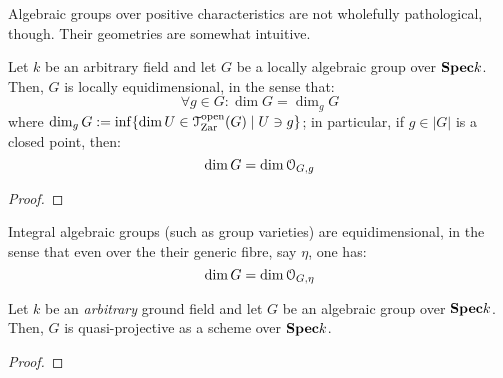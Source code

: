                 Algebraic groups over positive characteristics are not wholefully pathological, though. Their geometries are somewhat intuitive.
                \begin{proposition} \label{prop: algebraic_groups_are_locally_equidimensional} 
                    Let $k$ be an arbitrary field and let $G$ be a locally algebraic group over $\mathbf{Spec} k$. Then, $G$ is locally equidimensional, in the sense that:
                        $$\forall g \in G: \dim G = \dim_g G$$
                    where $\dim_g G := \inf\{\dim U \in \mathcal{T}^{\mathrm{open}}_{\mathrm{Zar}}(G) \mid U \ni g\}$; in particular, if $g \in |G|$ is a closed point, then:
                        $$\dim G = \dim \mathcal{O}_{G, g}$$
                \end{proposition}
                    \begin{proof}
                        
                    \end{proof}
                \begin{corollary}
                    Integral algebraic groups (such as group varieties) are equidimensional, in the sense that even over the their generic fibre, say $\eta$, one has:
                        $$\dim G = \dim \mathcal{O}_{G, \eta}$$
                \end{corollary}
                
                \begin{proposition} \label{prop: algebraic_groups_are_quasi_projective} 
                    Let $k$ be an \textit{arbitrary} ground field and let $G$ be an algebraic group over $\mathbf{Spec} k$. Then, $G$ is quasi-projective as a scheme over $\mathbf{Spec} k$.
                \end{proposition}
                    \begin{proof}
                        
                    \end{proof}
                
